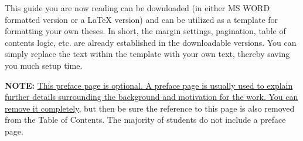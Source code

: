 This guide you are now reading can be downloaded (in either MS WORD formatted
version or a \LaTeX{} version) and can be utilized as a template for formatting
your own theses.  In short, the margin settings, pagination, table of contents
logic, etc. are already established in the downloadable versions.  You can
simply replace the text within the template with your own text, thereby saving
you much setup time.

\textbf{NOTE:} \uline{This preface page is optional.  A preface page is usually
used to explain further details surrounding the background and motivation for
the work.  You can remove it completely}, but then be sure the reference to
this page is also removed from the Table of Contents.  The majority of students
do not include a preface page.




\fi